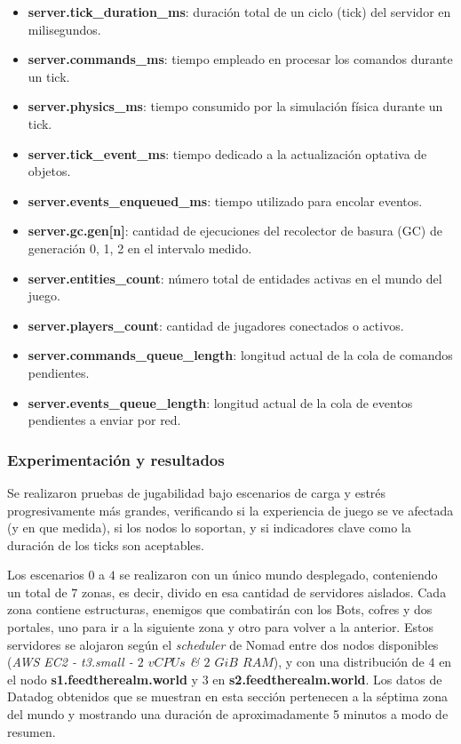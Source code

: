 \begin{itemize}
    \item \textbf{server.tick\_duration\_ms}: duración total de un ciclo (tick) del servidor en milisegundos.
    \item \textbf{server.commands\_ms}: tiempo empleado en procesar los comandos durante un tick.
    \item \textbf{server.physics\_ms}: tiempo consumido por la simulación física durante un tick.
    \item \textbf{server.tick\_event\_ms}: tiempo dedicado a la actualización optativa de objetos.
    \item \textbf{server.events\_enqueued\_ms}: tiempo utilizado para encolar eventos.
    \item \textbf{server.gc.gen[n]}: cantidad de ejecuciones del recolector de basura (GC) de generación 0, 1, 2 en el intervalo medido.
    \item \textbf{server.entities\_count}: número total de entidades activas en el mundo del juego.
    \item \textbf{server.players\_count}: cantidad de jugadores conectados o activos.
    \item \textbf{server.commands\_queue\_length}: longitud actual de la cola de comandos pendientes.
    \item \textbf{server.events\_queue\_length}: longitud actual de la cola de eventos pendientes a enviar por red.
\end{itemize}

\subsubsection{Experimentación y resultados}

Se realizaron pruebas de jugabilidad bajo escenarios de carga y estrés progresivamente más grandes,
verificando si la experiencia de juego se ve afectada (y en que medida), si los nodos lo soportan,
y si indicadores clave como la duración de los ticks son aceptables.

\vspace{0.25cm}

Los escenarios $0$ a $4$ se realizaron con un único mundo desplegado, conteniendo un total de $7$ zonas,
es decir, divido en esa cantidad de servidores aislados. Cada zona contiene estructuras, enemigos que combatirán con los Bots, cofres
y dos portales, uno para ir a la siguiente zona y otro para volver a la anterior.
Estos servidores se alojaron según el \textit{scheduler} de Nomad 
entre dos nodos disponibles (\textit{AWS EC2 - t3.small - $2$ $vCPUs$ \& $2$ $GiB$ $RAM$}), y con una distribución de $4$ en
el nodo \textbf{s1.feedtherealm.world} y $3$ en \textbf{s2.feedtherealm.world}. Los datos de Datadog obtenidos que se 
muestran en esta sección pertenecen a la séptima zona del mundo y mostrando una duración
de aproximadamente 5 minutos a modo de resumen.

